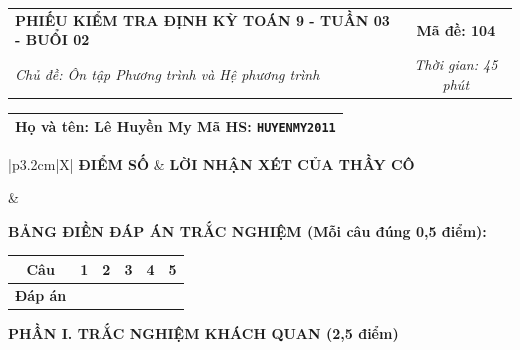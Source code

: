 \documentclass[12pt,a4paper]{article}
\begin{document}
\newpage


\noindent
\begin{tabularx}{\linewidth}{|X|c|}
\hline
\textbf{PHIẾU KIỂM TRA ĐỊNH KỲ TOÁN 9 - TUẦN 03 - BUỔI 02} & \textbf{Mã đề: 104} \\
\textit{Chủ đề: Ôn tập Phương trình và Hệ phương trình} & \textit{Thời gian: 45 phút} \\
\hline
\end{tabularx}

\vspace{1mm}

\noindent
\begin{tabularx}{\linewidth}{|X|}
\hline
\rule[-2mm]{0pt}{7.5mm}\textbf{Họ và tên:} \textbf{\large Lê Huyền My} \hfill \textbf{Mã HS:} \texttt{HUYENMY2011} \quad \\
\hline
\end{tabularx}

\vspace{1mm}

\noindent
\begin{tabularx}{\linewidth}{|p{3.2cm}|X|}
\hline
\centering\textbf{ĐIỂM SỐ} & \centering\textbf{LỜI NHẬN XÉT CỦA THẦY CÔ} \tabularnewline
\hline
\rule{0pt}{1.3cm} & \tabularnewline
\hline
\end{tabularx}

\vspace{1.2mm}

\noindent\textbf{BẢNG ĐIỀN ĐÁP ÁN TRẮC NGHIỆM (Mỗi câu đúng 0,5 điểm):}
\vspace{0.8mm}

\noindent
\renewcommand{\arraystretch}{1.35}
\begin{tabularx}{\linewidth}{|c|*{5}{>{\centering\arraybackslash}X|}}
\hline
\textbf{Câu} & \textbf{1} & \textbf{2} & \textbf{3} & \textbf{4} & \textbf{5} \\
\hline
\textbf{Đáp án} & & & & & \\
\hline
\end{tabularx}
\renewcommand{\arraystretch}{1.0}

\vspace{1.5mm}

\noindent\textbf{\large PHẦN I. TRẮC NGHIỆM KHÁCH QUAN (2,5 điểm)}
\vspace{1mm}
\end{document}

